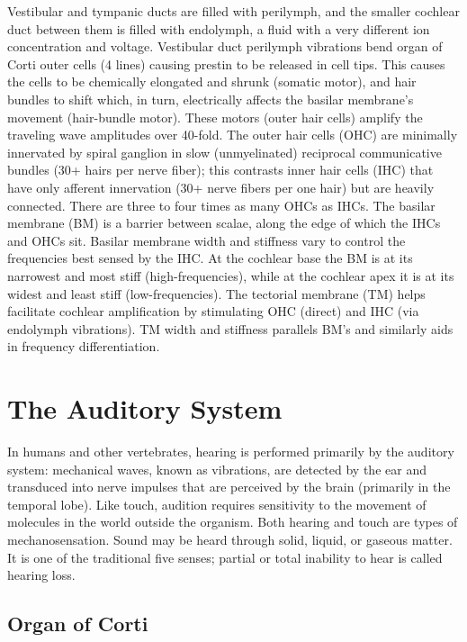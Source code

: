 \documentclass[]{book}
\begin{document}
Vestibular and tympanic ducts are filled with perilymph, and the smaller cochlear duct between them is filled with endolymph, a fluid with a very different ion concentration and voltage. Vestibular duct perilymph vibrations bend organ of Corti outer cells (4 lines) causing prestin to be released in cell tips. This causes the cells to be chemically elongated and shrunk (somatic motor), and hair bundles to shift which, in turn, electrically affects the basilar membrane's movement (hair-bundle motor). These motors (outer hair cells) amplify the traveling wave amplitudes over 40-fold. The outer hair cells (OHC) are minimally innervated by spiral ganglion in slow (unmyelinated) reciprocal communicative bundles (30+ hairs per nerve fiber); this contrasts inner hair cells (IHC) that have only afferent innervation (30+ nerve fibers per one hair) but are heavily connected. There are three to four times as many OHCs as IHCs. The basilar membrane (BM) is a barrier between scalae, along the edge of which the IHCs and OHCs sit. Basilar membrane width and stiffness vary to control the frequencies best sensed by the IHC. At the cochlear base the BM is at its narrowest and most stiff (high-frequencies), while at the cochlear apex it is at its widest and least stiff (low-frequencies). The tectorial membrane (TM) helps facilitate cochlear amplification by stimulating OHC (direct) and IHC (via endolymph vibrations). TM width and stiffness parallels BM's and similarly aids in frequency differentiation.

\hypertarget{the-auditory-system}{%
\section{The Auditory System}\label{the-auditory-system}}

In humans and other vertebrates, hearing is performed primarily by the auditory system: mechanical waves, known as vibrations, are detected by the ear and transduced into nerve impulses that are perceived by the brain (primarily in the temporal lobe). Like touch, audition requires sensitivity to the movement of molecules in the world outside the organism. Both hearing and touch are types of mechanosensation. Sound may be heard through solid, liquid, or gaseous matter. It is one of the traditional five senses; partial or total inability to hear is called hearing loss.

\hypertarget{organ-of-corti}{%
\subsection{Organ of Corti}\label{organ-of-corti}}
\end{document}
